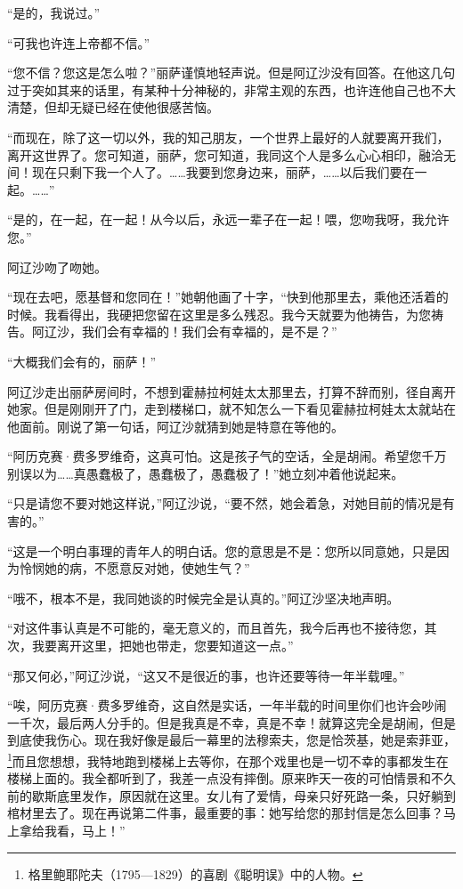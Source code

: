 \par “是的，我说过。”
\par “可我也许连上帝都不信。”
\par “您不信？您这是怎么啦？”丽萨谨慎地轻声说。但是阿辽沙没有回答。在他这几句过于突如其来的话里，有某种十分神秘的，非常主观的东西，也许连他自己也不大清楚，但却无疑已经在使他很感苦恼。
\par “而现在，除了这一切以外，我的知己朋友，一个世界上最好的人就要离开我们，离开这世界了。您可知道，丽萨，您可知道，我同这个人是多么心心相印，融洽无间！现在只剩下我一个人了。……我要到您身边来，丽萨，……以后我们要在一起。……”
\par “是的，在一起，在一起！从今以后，永远一辈子在一起！喂，您吻我呀，我允许您。”
\par 阿辽沙吻了吻她。
\par “现在去吧，愿基督和您同在！”她朝他画了十字，“快到他那里去，乘他还活着的时候。我看得出，我硬把您留在这里是多么残忍。我今天就要为他祷告，为您祷告。阿辽沙，我们会有幸福的！我们会有幸福的，是不是？”
\par “大概我们会有的，丽萨！”
\par 阿辽沙走出丽萨房间时，不想到霍赫拉柯娃太太那里去，打算不辞而别，径自离开她家。但是刚刚开了门，走到楼梯口，就不知怎么一下看见霍赫拉柯娃太太就站在他面前。刚说了第一句话，阿辽沙就猜到她是特意在等他的。
\par “阿历克赛·费多罗维奇，这真可怕。这是孩子气的空话，全是胡闹。希望您千万别误以为……真愚蠢极了，愚蠢极了，愚蠢极了！”她立刻冲着他说起来。
\par “只是请您不要对她这样说，”阿辽沙说，“要不然，她会着急，对她目前的情况是有害的。”
\par “这是一个明白事理的青年人的明白话。您的意思是不是：您所以同意她，只是因为怜悯她的病，不愿意反对她，使她生气？”
\par “哦不，根本不是，我同她谈的时候完全是认真的。”阿辽沙坚决地声明。
\par “对这件事认真是不可能的，毫无意义的，而且首先，我今后再也不接待您，其次，我要离开这里，把她也带走，您要知道这一点。”
\par “那又何必，”阿辽沙说，“这又不是很近的事，也许还要等待一年半载哩。”
\par “唉，阿历克赛·费多罗维奇，这自然是实话，一年半载的时间里你们也许会吵闹一千次，最后两人分手的。但是我真是不幸，真是不幸！就算这完全是胡闹，但是到底使我伤心。现在我好像是最后一幕里的法穆索夫，您是恰茨基，她是索菲亚，\footnote{格里鲍耶陀夫（1795—1829）的喜剧《聪明误》中的人物。}而且您想想，我特地跑到楼梯上去等你，在那个戏里也是一切不幸的事都发生在楼梯上面的。我全都听到了，我差一点没有摔倒。原来昨天一夜的可怕情景和不久前的歇斯底里发作，原因就在这里。女儿有了爱情，母亲只好死路一条，只好躺到棺材里去了。现在再说第二件事，最重要的事：她写给您的那封信是怎么回事？马上拿给我看，马上！”
